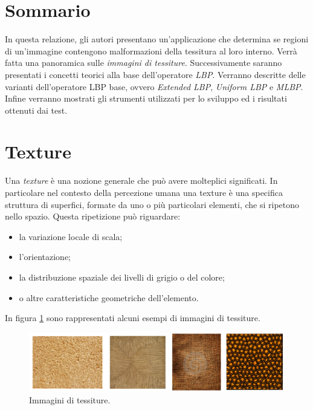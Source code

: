 \section*{Sommario}
In questa relazione, gli autori presentano un'applicazione che determina se regioni di un'immagine contengono malformazioni della tessitura al loro interno.
Verrà fatta una panoramica sulle \textit{immagini di tessiture}. Successivamente saranno presentati i concetti teorici alla base dell'operatore \textit{\acf{LBP}}. Verranno descritte delle varianti dell'operatore \acs{LBP} base, ovvero \textit{Extended LBP}, \textit{Uniform LBP} e \textit{\acf{MLBP}}. Infine verranno mostrati gli strumenti utilizzati per lo sviluppo ed i risultati ottenuti dai test.


\newpage
\null 
\thispagestyle{empty}
\newpage


\section{Texture}

Una \textit{texture} è una nozione generale che può avere molteplici significati. In particolare nel contesto della percezione umana una texture è una specifica struttura di superfici, formate da uno o più particolari elementi, che si ripetono nello spazio.
Questa ripetizione può riguardare:

\begin{itemize}
	\item la variazione locale di scala;
	\item l'orientazione;
	\item la distribuzione spaziale dei livelli di grigio o del colore\cite{Stockman:2001:CV:558008};
	\item o altre caratteristiche geometriche dell'elemento.
\end{itemize}

\noindent In figura \ref{fig:Texture} sono rappresentati alcuni esempi di immagini di tessiture. \\

\begin{figure}[ht]
\begin{center}
\includegraphics[width=.95\textwidth]{img/Texture}
\caption{ Immagini di tessiture.}
\label{fig:Texture}
\end{center}
\end{figure}


